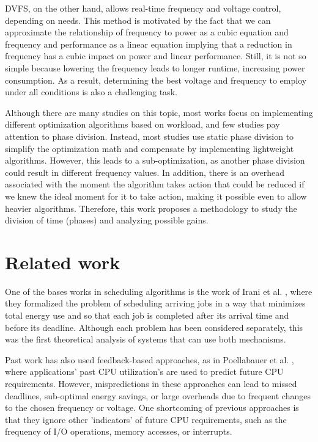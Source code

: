 DVFS, on the other hand, allows real-time frequency and voltage control, depending on needs. This method is motivated by the fact that we can approximate the relationship of frequency to power as a cubic equation and frequency and performance as a linear equation \cite{Dayarathna2016DataSurvey, Group2012HandbookSahni} implying that a reduction in frequency has a cubic impact on power and linear performance. Still, it is not so simple because lowering the frequency leads to longer runtime, increasing power consumption. As a result, determining the best voltage and frequency to employ under all conditions is also a challenging task.

Although there are many studies on this topic, most works focus on implementing different optimization algorithms based on workload, and few studies pay attention to phase division. Instead, most studies use static phase division to simplify the optimization math and compensate by implementing lightweight algorithms. However, this leads to a sub-optimization, as another phase division could result in different frequency values. In addition, there is an overhead associated with the moment the algorithm takes action that could be reduced if we knew the ideal moment for it to take action, making it possible even to allow heavier algorithms. Therefore, this work proposes a methodology to study the division of time (phases) and analyzing possible gains.

\section{Related work} \label{sec:related_work}

One of the bases works in scheduling algorithms is the work of Irani et al. \cite{Irani2007}, where they formalized the problem of scheduling arriving jobs in a way that minimizes total energy use and so that each job is completed after its arrival time and before its deadline. Although each problem has been considered separately, this was the first theoretical analysis of systems that can use both mechanisms.

Past work has also used feedback-based approaches, as in Poellabauer et al. \cite{Poellabauer2005}, where applications' past CPU utilization's are used to predict future  CPU  requirements. However, mispredictions in these approaches can lead to missed deadlines,  sub-optimal energy savings,  or large overheads due to frequent changes to the chosen frequency or voltage. One shortcoming of previous approaches is that they ignore other 'indicators' of future CPU requirements, such as the frequency of I/O operations, memory accesses, or interrupts.

